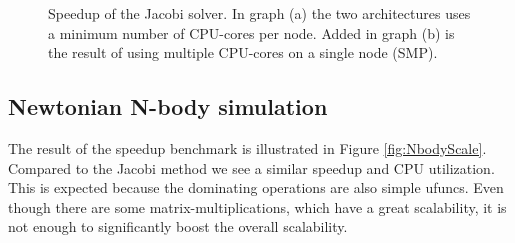\documentclass{sigplanconf}
\begin{document}
\begin{figure}%
  \begin{center}%
    \caption{Speedup of the Jacobi solver. In graph (a) the two architectures uses a minimum number of CPU-cores per node. Added in graph (b) is the result of using multiple CPU-cores on a single node (SMP).}%
    \label{fig:JacobiScale}%
  \end{center}
\end{figure}


\subsection{Newtonian N-body simulation}
The result of the speedup benchmark is illustrated in Figure \ref{fig:NbodyScale}. Compared to the Jacobi method we see a similar speedup and CPU utilization. This is expected because the dominating operations are also simple ufuncs. Even though there are some matrix-multiplications, which have a great scalability, it is not enough to significantly boost the overall scalability.
\end{document}
